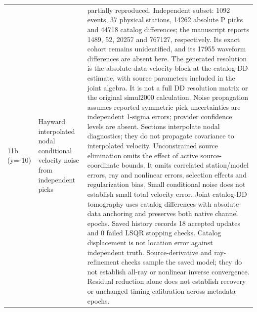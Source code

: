 \begin{longtable}{>{\raggedright\arraybackslash}p{}>{\raggedright\arraybackslash}p{}>{\raggedright\arraybackslash}p{}}
11b (y=-10) & Hayward interpolated nodal conditional velocity noise from independent picks & partially reproduced. Independent subset: 1092 events, 37 physical stations, 14262 absolute P picks and 44718 catalog differences; the manuscript reports 1489, 52, 20257 and 767127, respectively. Its exact cohort remains unidentified, and its 17955 waveform differences are absent here. The generated resolution is the absolute-data velocity block at the catalog-DD estimate, with source parameters included in the joint algebra. It is not a full DD resolution matrix or the original simul2000 calculation. Noise propagation assumes reported symmetric pick uncertainties are independent 1-sigma errors; provider confidence levels are absent. Sections interpolate nodal diagnostics; they do not propagate covariance to interpolated velocity. Unconstrained source elimination omits the effect of active source-coordinate bounds. It omits correlated station/model errors, ray and nonlinear errors, selection effects and regularization bias. Small conditional noise does not establish small total velocity error. Joint catalog-DD tomography uses catalog differences with absolute-data anchoring and preserves both native channel epochs. Saved history records 18 accepted updates and 0 failed LSQR stopping checks. Catalog displacement is not location error against independent truth. Source-derivative and ray-refinement checks sample the saved model; they do not establish all-ray or nonlinear inverse convergence. Residual reduction alone does not establish recovery or unchanged timing calibration across metadata epochs.\\

\end{longtable}

